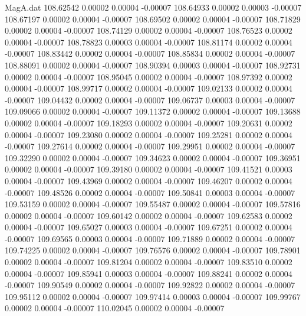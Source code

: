 \begin{filecontents}{MagA.dat}
 108.62542    0.00002    0.00004   -0.00007
 108.64933    0.00002    0.00003   -0.00007
 108.67197    0.00002    0.00004   -0.00007
 108.69502    0.00002    0.00004   -0.00007
 108.71829    0.00002    0.00004   -0.00007
 108.74129    0.00002    0.00004   -0.00007
 108.76523    0.00002    0.00004   -0.00007
 108.78823    0.00003    0.00004   -0.00007
 108.81174    0.00002    0.00004   -0.00007
 108.83442    0.00002    0.00004   -0.00007
 108.85834    0.00002    0.00004   -0.00007
 108.88091    0.00002    0.00004   -0.00007
 108.90394    0.00003    0.00004   -0.00007
 108.92731    0.00002    0.00004   -0.00007
 108.95045    0.00002    0.00004   -0.00007
 108.97392    0.00002    0.00004   -0.00007
 108.99717    0.00002    0.00004   -0.00007
 109.02133    0.00002    0.00004   -0.00007
 109.04432    0.00002    0.00004   -0.00007
 109.06737    0.00003    0.00004   -0.00007
 109.09066    0.00002    0.00004   -0.00007
 109.11372    0.00002    0.00004   -0.00007
 109.13688    0.00002    0.00004   -0.00007
 109.18293    0.00002    0.00004   -0.00007
 109.20631    0.00002    0.00004   -0.00007
 109.23080    0.00002    0.00004   -0.00007
 109.25281    0.00002    0.00004   -0.00007
 109.27614    0.00002    0.00004   -0.00007
 109.29951    0.00002    0.00004   -0.00007
 109.32290    0.00002    0.00004   -0.00007
 109.34623    0.00002    0.00004   -0.00007
 109.36951    0.00002    0.00004   -0.00007
 109.39180    0.00002    0.00004   -0.00007
 109.41521    0.00003    0.00004   -0.00007
 109.43969    0.00002    0.00004   -0.00007
 109.46207    0.00002    0.00004   -0.00007
 109.48526    0.00002    0.00004   -0.00007
 109.50841    0.00003    0.00004   -0.00007
 109.53159    0.00002    0.00004   -0.00007
 109.55487    0.00002    0.00004   -0.00007
 109.57816    0.00002    0.00004   -0.00007
 109.60142    0.00002    0.00004   -0.00007
 109.62583    0.00002    0.00004   -0.00007
 109.65027    0.00003    0.00004   -0.00007
 109.67251    0.00002    0.00004   -0.00007
 109.69565    0.00003    0.00004   -0.00007
 109.71889    0.00002    0.00004   -0.00007
 109.74225    0.00002    0.00004   -0.00007
 109.76576    0.00002    0.00004   -0.00007
 109.78901    0.00002    0.00004   -0.00007
 109.81204    0.00002    0.00004   -0.00007
 109.83510    0.00002    0.00004   -0.00007
 109.85941    0.00003    0.00004   -0.00007
 109.88241    0.00002    0.00004   -0.00007
 109.90549    0.00002    0.00004   -0.00007
 109.92822    0.00002    0.00004   -0.00007
 109.95112    0.00002    0.00004   -0.00007
 109.97414    0.00003    0.00004   -0.00007
 109.99767    0.00002    0.00004   -0.00007
 110.02045    0.00002    0.00004   -0.00007

\end{filecontents}

